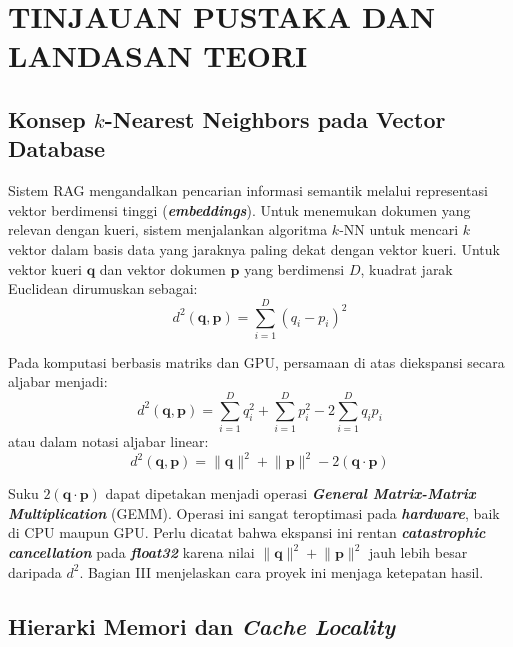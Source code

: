 \documentclass[12pt,a4paper,oneside]{report}
\newcommand{\keyword}[1]{\textbf{\textit{#1}}}
\newcommand{\vect}[1]{\mathbf{#1}}
\begin{document}
\chapter{TINJAUAN PUSTAKA DAN LANDASAN TEORI}

\section{Konsep \texorpdfstring{$k$}{k}-Nearest Neighbors pada Vector Database}

Sistem RAG mengandalkan pencarian informasi semantik melalui representasi vektor berdimensi tinggi (\keyword{embeddings}). Untuk menemukan dokumen yang relevan dengan kueri, sistem menjalankan algoritma $k$-NN untuk mencari $k$ vektor dalam basis data yang jaraknya paling dekat dengan vektor kueri. Untuk vektor kueri $\vect{q}$ dan vektor dokumen $\vect{p}$ yang berdimensi $D$, kuadrat jarak Euclidean dirumuskan sebagai:
\begin{equation}
d^{2}(\vect{q}, \vect{p}) = \sum_{i=1}^{D} (q_i - p_i)^{2}
\end{equation}

Pada komputasi berbasis matriks dan GPU, persamaan di atas diekspansi secara aljabar menjadi:
\begin{equation}
d^{2}(\vect{q}, \vect{p}) = \sum_{i=1}^{D} q_i^{2} + \sum_{i=1}^{D} p_i^{2} - 2 \sum_{i=1}^{D} q_i p_i
\end{equation}
atau dalam notasi aljabar linear:
\begin{equation}
d^{2}(\vect{q}, \vect{p}) = \lVert \vect{q} \rVert^{2} + \lVert \vect{p} \rVert^{2} - 2(\vect{q} \cdot \vect{p})
\end{equation}

Suku $2(\vect{q} \cdot \vect{p})$ dapat dipetakan menjadi operasi \keyword{General Matrix-Matrix Multiplication} (GEMM). Operasi ini sangat teroptimasi pada \keyword{hardware}, baik di CPU maupun GPU. Perlu dicatat bahwa ekspansi ini rentan \keyword{catastrophic cancellation} pada \keyword{float32} karena nilai $\lVert \vect{q} \rVert^{2} + \lVert \vect{p} \rVert^{2}$ jauh lebih besar daripada $d^{2}$. Bagian III menjelaskan cara proyek ini menjaga ketepatan hasil.

\section{Hierarki Memori dan \texorpdfstring{\textit{Cache Locality}}{Cache Locality}}
\end{document}
